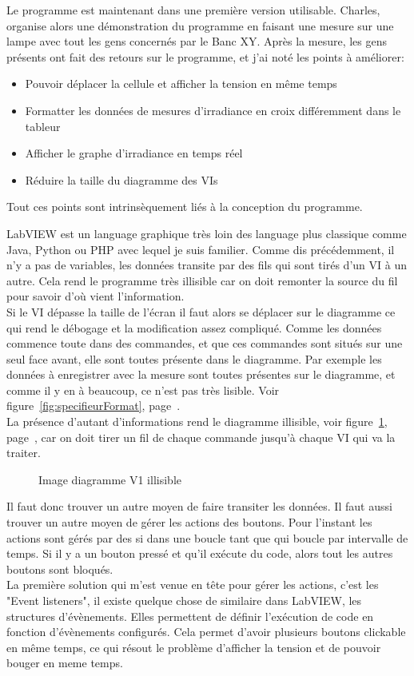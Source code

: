 \documentclass[12pt]{article}
\begin{document}
Le programme est maintenant dans une première version utilisable.
Charles, organise alors une démonstration du programme en faisant une mesure sur une lampe avec tout les gens concernés par le Banc XY.
Après la mesure, les gens présents ont fait des retours sur le programme, et j'ai noté les points à améliorer:
\begin{itemize}
	\item Pouvoir déplacer la cellule et afficher la tension en même temps
	\item Formatter les données de mesures d'irradiance en croix différemment dans le tableur
	\item Afficher le graphe d'irradiance en temps réel
	\item Réduire la taille du diagramme des VIs
\end{itemize}
Tout ces points sont intrinsèquement liés à la conception du programme.

LabVIEW est un language graphique très loin des language plus classique comme Java, Python ou PHP avec lequel je suis familier.
Comme dis précédemment, il n'y a pas de variables, les données transite par des fils qui sont tirés d'un VI à un autre.
Cela rend le programme très illisible car on doit remonter la source du fil pour savoir d'où vient l'information.\\
Si le VI dépasse la taille de l'écran il faut alors se déplacer sur le diagramme ce qui rend le débogage et la modification assez compliqué.
Comme les données commence toute dans des commandes, et que ces commandes sont situés sur une seul face avant, elle sont toutes présente dans le diagramme.
Par exemple les données à enregistrer avec la mesure sont toutes présentes sur le diagramme, et comme il y en à beaucoup, ce n'est pas très lisible.
Voir figure~\ref{fig:specifieurFormat}, page~\pageref{fig:specifieurFormat}.\\
La présence d'autant d'informations rend le diagramme illisible, voir figure~\ref{fig:diagrammeV1}, page~\pageref{fig:diagrammeV1}, car on doit tirer un fil de chaque commande jusqu'à chaque VI qui va la traiter.

\begin{figure}[p]
	\centering
	\caption{Image diagramme V1 illisible}
	\label{fig:diagrammeV1}
\end{figure}


Il faut donc trouver un autre moyen de faire transiter les données.
Il faut aussi trouver un autre moyen de gérer les actions des boutons.
Pour l'instant les actions sont gérés par des si dans une boucle tant que qui boucle par intervalle de temps. Si il y a un bouton pressé et qu'il exécute du code, alors tout les autres boutons sont bloqués.\\
La première solution qui m'est venue en tête pour gérer les actions, c'est les "Event listeners", il existe quelque chose de similaire dans LabVIEW, les structures d'évènements.
Elles permettent de définir l'exécution de code en fonction d'évènements configurés.
Cela permet d'avoir plusieurs boutons clickable en même temps, ce qui résout le problème d'afficher la tension et de pouvoir bouger en meme temps.
\end{document}
